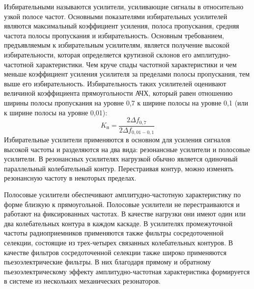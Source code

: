 \documentclass[unicode, 12pt, a4paper, oneside]{article}
\begin{document}
Избирательными называются усилители, усиливающие сигналы в относительно узкой полосе частот. Основными показателями избирательных усилителей являются максимальный коэффициент усиления, полоса пропускания, средняя частота полосы пропускания и избирательность. Основным требованием, предъявляемым к избирательным усилителям, является получение высокой избирательности, которая определяется крутизной склонов его амплитудно-частотной характеристики. Чем круче спады частотной характеристики и чем меньше коэффициент усиления усилителя за пределами полосы пропускания, тем выше его избирательность. Избирательность таких усилителей оценивают величиной коэффициента прямоугольности АЧХ, который равен отношению ширины полосы пропускания на уровне 0,7 к ширине полосы на уровне 0,1 (или к ширине полосы на уровне 0,01):
\begin{equation}
K_\text{п} = \dfrac{2\Delta f_{0,7}}{2\Delta f_{0,01 - 0,1}}
\end{equation}
Избирательные усилители применяются в основном для усиления сигналов высокой частоты и разделяются на два вида: резонансные усилители и полосовые усилители. В резонансных усилителях нагрузкой обычно является одиночный параллельный колебательный контур. Перестраивая контур, можно изменять резонансную частоту в некоторых пределах.

Полосовые усилители обеспечивают амплитудно-частотную характеристику по форме близкую к прямоугольной. Полосовые усилители не перестраиваются и работают на фиксированных частотах. В качестве нагрузки они имеют один или два колебательных контура в каждом каскаде. В усилителях промежуточной частоты радиоприемников применяются также фильтры сосредоточенной селекции, состоящие из трех-четырех связанных колебательных контуров. В качестве фильтров сосредоточенной селекции также широко применяются пьезоэлектрические фильтры. В них благодаря прямому и обратному пьезоэлектрическому эффекту амплитудно-частотная характеристика формируется в системе из нескольких механических резонаторов.
\end{document}
